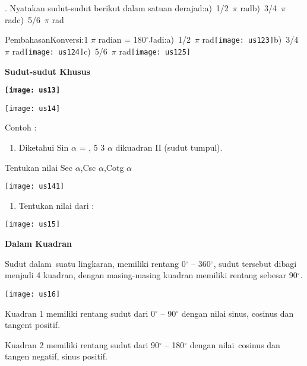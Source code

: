 \documentclass[11pt,fleqn]{book} %
\begin{document}
. Nyatakan sudut-sudut berikut dalam satuan derajad:a)~1/2~$\pi$ radb)~3/4~$\pi$ radc)~5/6~$\pi$ rad

\noindent PembahasanKonversi:1 $\pi$ radian = 180$\mathrm{{}^\circ}$Jadi:a)~1/2~$\pi$ rad\texttt{[image: us123]}b)~3/4~$\pi$ rad\texttt{[image: us124]}c)~5/6~$\pi$ rad\texttt{[image: us125]}

\noindent 

\noindent \textbf{Sudut-sudut Khusus}

\noindent \textbf{\texttt{[image: us13]}}

\noindent \texttt{[image: us14]}\textbf{}

\noindent Contoh : 

\begin{enumerate}
\item  Diketahui Sin $\alpha$ = , 5 3 $\alpha$ dikuadran II (sudut tumpul). 
\end{enumerate}

Tentukan nilai Sec $\alpha$,Csc $\alpha$,Cotg $\alpha$ 

 \texttt{[image: us141]}

\noindent 

\begin{enumerate}
\item   Tentukan nilai dari :
\end{enumerate}

\noindent \texttt{[image: us15]}

\noindent \textbf{Dalam Kuadran}

\noindent Sudut dalam~suatu lingkaran, memiliki rentang 0${}^\circ$ -- 360${}^\circ$, sudut tersebut dibagi menjadi 4 kuadran, dengan masing-masing kuadran memiliki rentang sebesar 90${}^\circ$.

\noindent \texttt{[image: us16]}\textbf{}

\noindent \textbf{}

\noindent Kuadran 1 memiliki rentang sudut dari 0${}^\circ$ -- 90${}^\circ$ dengan nilai sinus, cosinus dan tangent positif.

\noindent Kuadran 2 memiliki rentang sudut dari 90${}^\circ$ -- 180${}^\circ$ dengan nilai~cosinus dan tangen negatif, sinus positif.
\end{document}
